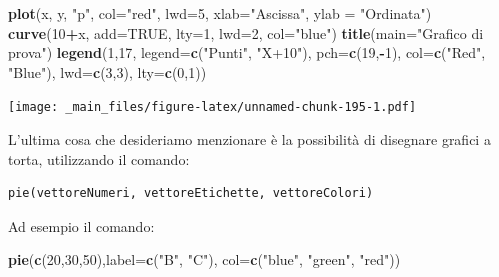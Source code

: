 \documentclass[a4paper,12pt,oneside]{book}
\newenvironment{Shaded}{\begin{snugshade}}{\end{snugshade}}
\newcommand{\KeywordTok}[1]{\textcolor[rgb]{0.13,0.29,0.53}{\textbf{#1}}}
\newcommand{\DataTypeTok}[1]{\textcolor[rgb]{0.13,0.29,0.53}{#1}}
\newcommand{\DecValTok}[1]{\textcolor[rgb]{0.00,0.00,0.81}{#1}}
\newcommand{\StringTok}[1]{\textcolor[rgb]{0.31,0.60,0.02}{#1}}
\newcommand{\OtherTok}[1]{\textcolor[rgb]{0.56,0.35,0.01}{#1}}
\newcommand{\OperatorTok}[1]{\textcolor[rgb]{0.81,0.36,0.00}{\textbf{#1}}}
\newcommand{\NormalTok}[1]{#1}
\theoremstyle{definition}
\theoremstyle{definition}
\theoremstyle{definition}
\theoremstyle{remark}
\begin{document}
\begin{Shaded}
\begin{Highlighting}[]
\KeywordTok{plot}\NormalTok{(x, y, }\StringTok{"p"}\NormalTok{, }\DataTypeTok{col=}\StringTok{"red"}\NormalTok{, }\DataTypeTok{lwd=}\DecValTok{5}\NormalTok{, }\DataTypeTok{xlab=}\StringTok{"Ascissa"}\NormalTok{, }
       \DataTypeTok{ylab =} \StringTok{"Ordinata"}\NormalTok{)}
\KeywordTok{curve}\NormalTok{(}\DecValTok{10}\OperatorTok{+}\NormalTok{x, }\DataTypeTok{add=}\OtherTok{TRUE}\NormalTok{, }\DataTypeTok{lty=}\DecValTok{1}\NormalTok{, }\DataTypeTok{lwd=}\DecValTok{2}\NormalTok{, }\DataTypeTok{col=}\StringTok{"blue"}\NormalTok{)}
\KeywordTok{title}\NormalTok{(}\DataTypeTok{main=}\StringTok{"Grafico di prova"}\NormalTok{)}
\KeywordTok{legend}\NormalTok{(}\DecValTok{1}\NormalTok{,}\DecValTok{17}\NormalTok{, }\DataTypeTok{legend=}\KeywordTok{c}\NormalTok{(}\StringTok{"Punti"}\NormalTok{, }\StringTok{"X+10"}\NormalTok{), }\DataTypeTok{pch=}\KeywordTok{c}\NormalTok{(}\DecValTok{19}\NormalTok{,}\OperatorTok{-}\DecValTok{1}\NormalTok{), }
  \DataTypeTok{col=}\KeywordTok{c}\NormalTok{(}\StringTok{"Red"}\NormalTok{, }\StringTok{"Blue"}\NormalTok{), }\DataTypeTok{lwd=}\KeywordTok{c}\NormalTok{(}\DecValTok{3}\NormalTok{,}\DecValTok{3}\NormalTok{), }\DataTypeTok{lty=}\KeywordTok{c}\NormalTok{(}\DecValTok{0}\NormalTok{,}\DecValTok{1}\NormalTok{))}
\end{Highlighting}
\end{Shaded}

\texttt{[image: \_main\_files/figure-latex/unnamed-chunk-195-1.pdf]}

L'ultima cosa che desideriamo menzionare è la possibilità di disegnare
grafici a torta, utilizzando il comando:

\begin{verbatim}
pie(vettoreNumeri, vettoreEtichette, vettoreColori)
\end{verbatim}

Ad esempio il comando:

\begin{Shaded}
\begin{Highlighting}[]
\KeywordTok{pie}\NormalTok{(}\KeywordTok{c}\NormalTok{(}\DecValTok{20}\NormalTok{,}\DecValTok{30}\NormalTok{,}\DecValTok{50}\NormalTok{),}\DataTypeTok{label=}\KeywordTok{c}\NormalTok{(}\StringTok{"B"}\NormalTok{, }\StringTok{"C"}\NormalTok{),}
        \DataTypeTok{col=}\KeywordTok{c}\NormalTok{(}\StringTok{"blue"}\NormalTok{, }\StringTok{"green"}\NormalTok{, }\StringTok{"red"}\NormalTok{))}
\end{Highlighting}
\end{Shaded}
\end{document}
